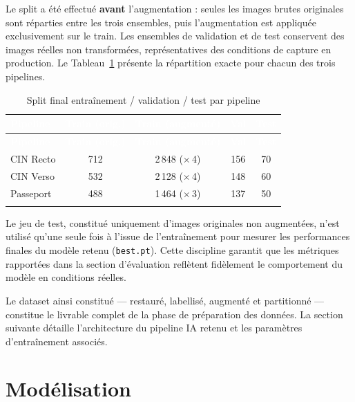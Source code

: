 Le split a été effectué \textbf{avant} l'augmentation : seules les images brutes originales sont réparties entre les trois ensembles, puis l'augmentation est appliquée exclusivement sur le train. Les ensembles de validation et de test conservent des images réelles non transformées, représentatives des conditions de capture en production. Le Tableau~\ref{tab:split-final} présente la répartition exacte pour chacun des trois pipelines.

\renewcommand{\arraystretch}{1.3}
\setlength{\LTleft}{0pt plus 1fill}
\setlength{\LTright}{0pt plus 1fill}
\begin{longtable}{|l|c|c|c|c|}
  \rowcolor{bleu_principal}
  \textcolor{white}{\textbf{Pipeline}} &
  \textcolor{white}{\textbf{Train (orig.)}} &
  \textcolor{white}{\textbf{Train (augmenté)}} &
  \textcolor{white}{\textbf{Val}} &
  \textcolor{white}{\textbf{Test}} \\
  \hline
  \endfirsthead
  \rowcolor{bleu_principal}
  \textcolor{white}{\textbf{Pipeline}} &
  \textcolor{white}{\textbf{Train (orig.)}} &
  \textcolor{white}{\textbf{Train (augmenté)}} &
  \textcolor{white}{\textbf{Val}} &
  \textcolor{white}{\textbf{Test}} \\
  \hline
  \endhead
  CIN Recto & 712  & 2\,848 ($\times$\,4) & 156 & 70 \\ \hline
  CIN Verso & 532  & 2\,128 ($\times$\,4) & 148 & 60 \\ \hline
  Passeport & 488  & 1\,464 ($\times$\,3) & 137 & 50 \\ \hline
  \caption{Split final entraînement / validation / test par pipeline}
  \label{tab:split-final}
\end{longtable}

\noindent Le jeu de test, constitué uniquement d'images originales non augmentées, n'est utilisé qu'une seule fois à l'issue de l'entraînement pour mesurer les performances finales du modèle retenu (\texttt{best.pt}). Cette discipline garantit que les métriques rapportées dans la section d'évaluation reflètent fidèlement le comportement du modèle en conditions réelles.

Le dataset ainsi constitué --- restauré, labellisé, augmenté et partitionné --- constitue le livrable complet de la phase de préparation des données. La section suivante détaille l'architecture du pipeline IA retenu et les paramètres d'entraînement associés.


\section{Modélisation}
\label{sec:modelisation}

